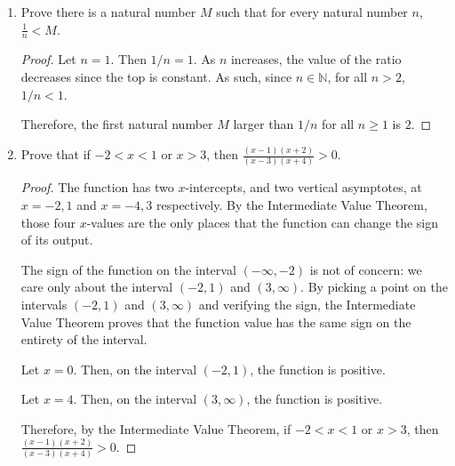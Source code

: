 \documentclass[10pt]{article}
\theoremstyle{definition}
\theoremstyle{plain}
\newcommand{\N}{\mathbb{N}}
\begin{document}
\begin{enumerate}
\item Prove there is a natural number $M$ such that for every natural number $n$, $\frac{1}{n} < M$.
  \begin{proof}
    Let $n=1$. Then $1/n=1$. As $n$ increases, the value of the ratio decreases since the top is constant. As such, since $n\in\N$, for all $n>2$, $1/n < 1$.
    \\
    \par Therefore, the first natural number $M$ larger than $1/n$ for all $n\geq 1$ is $2$.
  \end{proof}

\item Prove that if $-2 < x < 1$ or $x > 3$, then $\frac{(x-1)(x+2)}{(x-3)(x+4)} > 0$.
  \begin{proof}
    The function has two $x$-intercepts, and two vertical asymptotes, at $x=-2,1$ and $x=-4,3$ respectively. By the Intermediate Value Theorem, those four $x$-values are the only places that the function can change the sign of its output.
    \\
    \par The sign of the function on the interval $(-\infty, -2)$ is not of concern: we care only about the interval $(-2,1)$ and $(3,\infty)$. By picking a point on the intervals $(-2,1)$ and $(3,\infty)$ and verifying the sign, the Intermediate Value Theorem proves that the function value has the same sign on the entirety of the interval.
    \\
    \par Let $x=0$. Then, on the interval $(-2,1)$, the function is positive.
    \\
    \par Let $x=4$. Then, on the interval $(3,\infty)$, the function is positive.
    \\
    \par Therefore, by the Intermediate Value Theorem, if $-2 < x < 1$ or $x > 3$, then $\frac{(x-1)(x+2)}{(x-3)(x+4)} > 0$.
  \end{proof}
\end{enumerate} %
\end{document}
